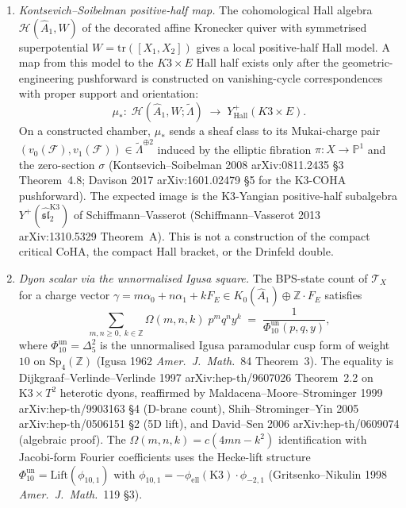 \begin{proposition}
\begin{enumerate}
Cecotti--Vafa 2011 (arXiv:1103.5628 \S 8.1) BPS quiver of pure
$\mathcal N=2$ $SU(2)$ super-Yang--Mills on $\mathbb R^{3,1}$; the
M-theory lift on K3-fibred CY$_3$ decorates each $\mathbb C^{\mu_i}$-
fibre by the K3 Picard class $\mu_i\in\mathrm{NS}(S)$
(Katz--Klemm--Vafa 1996 \S 5 geometric-engineering fibre-class map).
The Coulomb-branch complex dimension
$\dim_{\mathbb C}\mathcal U(\mathcal T_X) = \mathrm{rk}(\widehat A_1)+\rho_S+1 = \rho_S+2$
matches $h^{1,1}(X)$ with one dimension the $E$-modulus.
\item \emph{Kontsevich--Soibelman positive-half map.} The cohomological
Hall algebra $\mathcal H(\widehat A_1,W)$ of the decorated affine
Kronecker quiver with symmetrised superpotential
$W=\mathrm{tr}([X_1,X_2])$ gives a local positive-half Hall model. A map
from this model to the $K3\times E$ Hall half exists only after the
geometric-engineering pushforward is constructed on vanishing-cycle
correspondences with proper support and orientation:
\[
 \mu_*:\;\mathcal H(\widehat A_1,W;\widetilde\Lambda)
 \;\longrightarrow\;
 Y^+_{\mathrm{Hall}}(K3\times E).
\]
On a constructed chamber, $\mu_*$ sends a sheaf class to its
Mukai-charge pair
$(v_0(\mathcal F),v_1(\mathcal F))\in\widetilde\Lambda^{\oplus 2}$
induced by the elliptic fibration $\pi:X\to\mathbb P^1$ and the
zero-section $\sigma$ (Kontsevich--Soibelman 2008 arXiv:0811.2435
\S 3 Theorem~4.8; Davison 2017 arXiv:1601.02479 \S 5 for the K3-COHA
pushforward). The expected image is the K3-Yangian positive-half
subalgebra $Y^+(\widehat{\mathfrak{sl}}_2^{\mathrm{K3}})$ of
Schiffmann--Vasserot (Schiffmann--Vasserot 2013 arXiv:1310.5329
Theorem~A). This is not a construction of the compact critical CoHA,
the compact Hall bracket, or the Drinfeld double.
\item \emph{Dyon scalar via the unnormalised Igusa square.}
The BPS-state count of $\mathcal T_X$ for a charge vector
$\gamma=m\alpha_0+n\alpha_1+k F_E\in K_0(\widehat A_1)\oplus\mathbb Z\cdot F_E$
satisfies
\[
 \sum_{m,n\ge 0,\;k\in\mathbb Z}\Omega(m,n,k)\;p^m q^n y^k
 \;=\; \frac{1}{\Phi_{10}^{\mathrm{un}}(p,q,y)},
\]
where $\Phi_{10}^{\mathrm{un}}=\Delta_5^2$ is the unnormalised Igusa
paramodular cusp form of weight $10$ on $\mathrm{Sp}_4(\mathbb Z)$
(Igusa 1962 \emph{Amer.\ J.\ Math.}~84 Theorem~3). The equality is
Dijkgraaf--Verlinde--Verlinde 1997 arXiv:hep-th/9607026 Theorem~2.2
on $\mathrm{K3}\times T^2$ heterotic dyons, reaffirmed by
Maldacena--Moore--Strominger 1999 arXiv:hep-th/9903163 \S 4 (D-brane
count), Shih--Strominger--Yin 2005 arXiv:hep-th/0506151 \S 2 (5D
lift), and David--Sen 2006 arXiv:hep-th/0609074 (algebraic proof).
The $\Omega(m,n,k)=c(4mn-k^2)$ identification with Jacobi-form
Fourier coefficients uses the Hecke-lift structure
$\Phi_{10}^{\mathrm{un}}=\mathrm{Lift}(\phi_{10,1})$ with
$\phi_{10,1}=-\phi_{\mathrm{ell}}(\mathrm K3)\cdot\phi_{-2,1}$
(Gritsenko--Nikulin 1998 \emph{Amer.\ J.\ Math.}~119 \S 3).
\end{enumerate}
\end{proposition}

